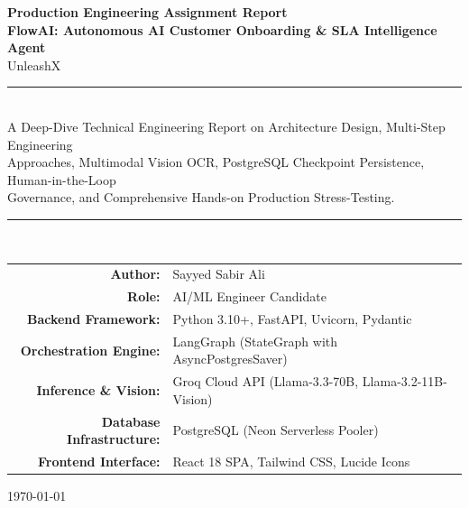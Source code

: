 \documentclass[12pt,a4paper]{article}
\begin{document}

\begin{titlepage}
    \centering

    \vspace*{1.2cm}

    {\Large \textbf{Production Engineering Assignment Report}}\\[0.5cm]

    {\Huge \textbf{FlowAI: Autonomous AI Customer Onboarding \& SLA Intelligence Agent}}\\[0.8cm]

    {\Large UnleashX}\\[1.2cm]

    \rule{\textwidth}{0.5pt}\\[0.4cm]

    {\large
    A Deep-Dive Technical Engineering Report on Architecture Design, Multi-Step Engineering\\
    Approaches, Multimodal Vision OCR, PostgreSQL Checkpoint Persistence, Human-in-the-Loop\\
    Governance, and Comprehensive Hands-on Production Stress-Testing.
    }

    \rule{\textwidth}{0.5pt}\\[1.5cm]

    \begin{tabular}{rl}
        \textbf{Author:} & Sayyed Sabir Ali \\
        \textbf{Role:} & AI/ML Engineer Candidate \\
        \textbf{Backend Framework:} & Python 3.10+, FastAPI, Uvicorn, Pydantic \\
        \textbf{Orchestration Engine:} & LangGraph (StateGraph with AsyncPostgresSaver) \\
        \textbf{Inference \& Vision:} & Groq Cloud API (Llama-3.3-70B, Llama-3.2-11B-Vision) \\
        \textbf{Database Infrastructure:} & PostgreSQL (Neon Serverless Pooler) \\
        \textbf{Frontend Interface:} & React 18 SPA, Tailwind CSS, Lucide Icons \\
    \end{tabular}

    \vfill

    {\large \today}

\end{titlepage}
\end{document}
